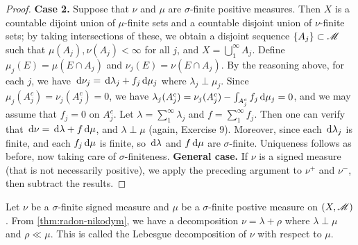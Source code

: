 \documentclass[12pt]{article} %
\begin{document}
\begin{proof}
    \textbf{Case 2.} Suppose that $\nu$ and $\mu$ are $\sigma$-finite positive measures. Then $X$ is a countable dijoint union of $\mu$-finite sets and a countable disjoint union of $\nu$-finite sets; by taking intersections of these, we obtain a disjoint sequence $\{A_j\} \subset \mathscr{M}$ such that $\mu(A_j), \nu(A_j) < \infty$ for all $j$, and $X = \bigcup_1^\infty A_j$. Define $\mu_j(E) = \mu(E \cap A_j)$ and $\nu_j(E) = \nu(E \cap A_j)$. By the reasoning above, for each $j$, we have $\, \mathrm{d}\nu_j = \, \mathrm{d}\lambda_j + f_j\, \mathrm{d}\mu_j$ where $\lambda_j \perp \mu_j$. Since $\mu_j(A_j^c) = \nu_j(A_j^c) = 0$, we have $\lambda_j(A_j^c) = \nu_j(A_j^c) - \int_{A_j^c}f_j \, \mathrm{d} \mu_j = 0$, and we may assume that $f_j = 0$ on $A_j^c$. Let $\lambda = \sum_1^\infty \lambda_j$ and $f = \sum_1^\infty f_j$. Then one can verify that $\, \mathrm{d} \nu = \, \mathrm{d}\lambda + f \, \mathrm{d}\mu$, and $\lambda \perp \mu$ (again, Exercise 9). Moreover, since each $\, \mathrm{d} \lambda_j$ is finite, and each $f_j \, \mathrm{d} \mu$ is finite, so $\, \mathrm{d}\lambda$ and $f \, \mathrm{d} \mu$ are $\sigma$-finite. Uniqueness follows as before, now taking care of $\sigma$-finiteness. \textbf{General case.} If $\nu$ is a signed measure (that is not necessarily positive), we apply the preceding argument to $\nu^+$ and $\nu^-$, then subtract the results.
\end{proof}

\begin{definition}
    Let $\nu$ be a $\sigma$-finite signed measure and $\mu$ be a $\sigma$-finite postive measure on $(X, \mathscr{M})$. From \cref{thm:radon-nikodym}, we have a decomposition $\nu = \lambda + \rho$ where $\lambda \perp \mu$ and $\rho \ll \mu$. This is called the Lebesgue decomposition of $\nu$ with respect to $\mu$.
\end{definition}
\end{document}

